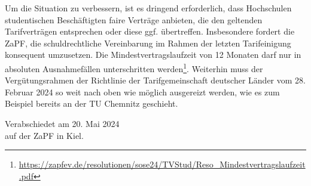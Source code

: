 \documentclass[DIV=calc]{scrartcl}
\begin{document}
Um die Situation zu verbessern, ist es dringend erforderlich, dass Hochschulen studentischen Beschäftigten faire Verträge anbieten, die den geltenden Tarifverträgen entsprechen oder diese ggf. übertreffen. Insbesondere fordert die ZaPF, die schuldrechtliche Vereinbarung im Rahmen der letzten Tarifeinigung konsequent umzusetzen. Die Mindestvertragslaufzeit von 12 Monaten darf nur in absoluten Ausnahmefällen unterschritten werden\footnote{\url{https://zapfev.de/resolutionen/sose24/TVStud/Reso_Mindestvertragslaufzeit.pdf}}. Weiterhin muss der Vergütungsrahmen der Richtlinie der Tarifgemeinschaft deutscher Länder vom 28. Februar 2024 so weit nach oben wie möglich ausgereizt werden, wie es zum Beispiel bereits an der TU Chemnitz geschieht. 


%
\vfill
\begin{flushright}
	Verabschiedet am 20. Mai 2024 \\
	auf der ZaPF in Kiel.
\end{flushright}
\end{document}
